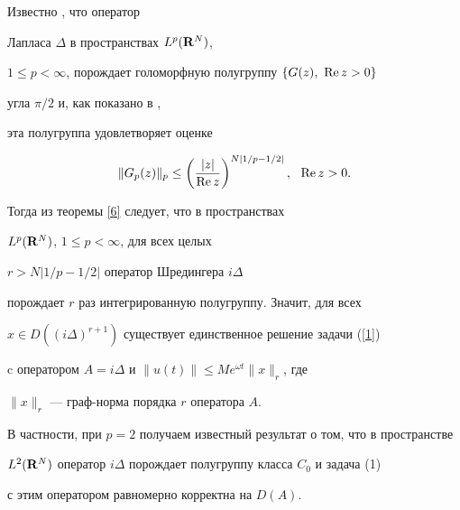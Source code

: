 Известно \cite{Pazy}, что оператор 


Лапласа $\Delta$ в пространствах $L^p(\bold R^N)$, 


$1\leq p<\infty$, порождает голоморфную полугруппу $\{G(z),\ \operatorname{Re} z>0\}$


угла $\pi/2$ и, как показано в \cite{Boyadzhiev}, 


эта полугруппа удовлетворяет оценке


$$


\|G_p(z)\|_p\leq \left(\frac{|z|}{\re z}\right) ^{N|1/p-1/2|},\ \ \re z>0.


$$


Тогда из теоремы \ref{6} следует, что в пространствах


$L^p(\bold R^N)$, $1\leq p<\infty$,  для всех целых\linebreak


$r>N|1/p-1/2|$ оператор Шредингера $i\Delta$


порождает  $r$ раз интегрированную полугруппу. Значит, для всех 


$x\in D((i\Delta)^{r+1})$ существует единственное решение задачи (\ref{1})


c оператором $A=i\Delta$ и $\|u(t)\|\leq Me^{\omega t}\|x\|_r$, где


$\|x\|_r$ --- граф-норма порядка $r$ оператора $A$. 


В частности, при $p=2$ получаем известный результат о том, что в пространстве 


$L^2(\bold R^N)$ оператор $i\Delta$ порождает полугруппу класса $C_0$ и задача (1)


с этим оператором равномерно корректна на $D(A)$.





